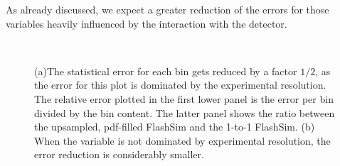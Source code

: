    As already discussed, we expect a greater reduction of the errors for those variables heavily influenced by the interaction with the detector.
   
       \begin{figure}
       \myfloatalign
    \\
    \caption[Upsampling error reduction]{(a)The statistical error for each bin gets reduced by a factor $1/2$, as the error for this plot is dominated by the experimental resolution. The relative error plotted in the first lower panel is the error per bin divided by the bin content. The latter panel shows the ratio between the upsampled, pdf-filled FlashSim and the 1-to-1 FlashSim. (b) When the variable is not dominated by experimental resolution, the error reduction is considerably smaller.}
    \label{fig:updnnHMM}
   \end{figure}
   
